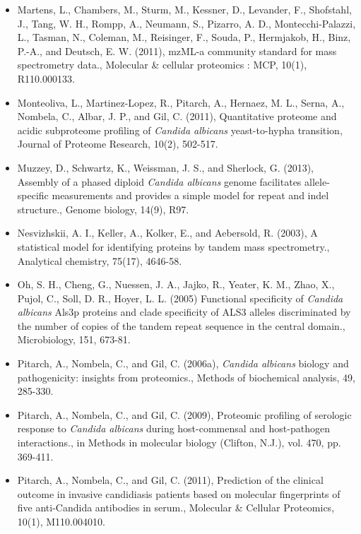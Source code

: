 \begin{itemize}[leftmargin=*]
\item[]{%
Martens, L., Chambers, M., Sturm, M., Kessner, D., Levander, F., Shofstahl, J., Tang, W. H.,
Rompp, A., Neumann, S., Pizarro, A. D., Montecchi-Palazzi, L., Tasman, N., Coleman, M.,
Reisinger, F., Souda, P., Hermjakob, H., Binz, P.-A., and Deutsch, E. W. (2011), mzML-a
community standard for mass spectrometry data., Molecular \& cellular proteomics : MCP,
10(1), R110.000133.
}

\item[]{%
Monteoliva, L., Martinez-Lopez, R., Pitarch, A., Hernaez, M. L., Serna, A., Nombela, C., Albar,
J. P., and Gil, C. (2011), Quantitative proteome and acidic subproteome profiling of \textit{Candida
albicans} yeast-to-hypha transition, Journal of Proteome Research, 10(2), 502-517.
}

\item[]{%
Muzzey, D., Schwartz, K., Weissman, J. S., and Sherlock, G. (2013), Assembly of a phased
diploid \textit{Candida albicans} genome facilitates allele-specific measurements and provides a
simple model for repeat and indel structure., Genome biology, 14(9), R97.
}

\item[]{%
Nesvizhskii, A. I., Keller, A., Kolker, E., and Aebersold, R. (2003), A statistical model for 
identifying proteins by tandem mass spectrometry., Analytical chemistry, 75(17), 4646-58.
}

\item[]{
Oh, S. H., Cheng, G., Nuessen, J. A., Jajko, R., Yeater, K. M., Zhao, X., Pujol, C., Soll, D. R., Hoyer,  L. L. (2005)
Functional specificity of \textit{Candida albicans} Als3p proteins and clade specificity of ALS3 
alleles discriminated by the number of copies of the tandem repeat sequence in the central domain.,
Microbiology, 151, 673-81.
}

\item[]{%
Pitarch, A., Nombela, C., and Gil, C. (2006a), \textit{Candida albicans} biology and pathogenicity:
insights from proteomics., 
Methods of biochemical analysis, 49, 285-330.
}

\item[]{%
Pitarch, A., Nombela, C., and Gil, C. (2009), Proteomic profiling of serologic response to 
\textit{Candida albicans} during host-commensal and host-pathogen interactions., 
in Methods in molecular biology (Clifton, N.J.), vol. 470, pp. 369-411.
}

\item[]{%
Pitarch, A., Nombela, C., and Gil, C. (2011), Prediction of the clinical outcome in invasive 
candidiasis patients based on molecular fingerprints of five anti-Candida antibodies in serum.,
Molecular \& Cellular Proteomics, 10(1), M110.004010.
}


\end{itemize}
